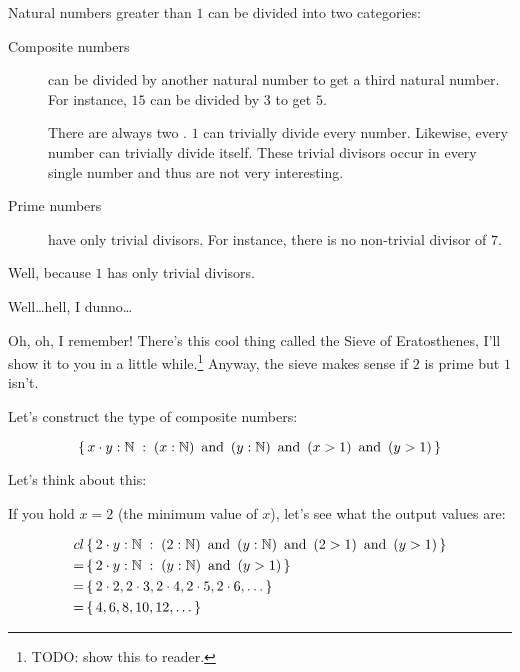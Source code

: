 \begin{example}
    Natural numbers greater than $1$ can be divided into two categories:

    \begin{description}
      \item[Composite numbers] can be divided by another natural number to get a
        third natural number. For instance, $15$ can be divided by $3$ to get
        $5$.

        There are always two . $1$ can trivially divide
        every number. Likewise, every number can trivially divide itself. These
        trivial divisors occur in every single number and thus are not very
        interesting.

      \item[Prime numbers] have only trivial divisors. For instance, there is no
        non-trivial divisor of $7$.
    \end{description}


    Well, because $1$ has only trivial divisors.


    Well\dots hell, I dunno\dots

    Oh, oh, I remember! There's this cool thing called the Sieve of
    Eratosthenes, I'll show it to you in a little while.\footnote{TODO: show
      this to reader.} Anyway, the sieve makes sense if $2$ is prime but $1$
    isn't.

    Let's construct the type of composite numbers:

    \begin{equation}
        \label{eq:composite}
        \left\{\, x \cdot y : \mathbb{N}\; : \; 
          \left( x : \mathbb{N} \right)
          \text{ and }
          \left( y : \mathbb{N} \right)
          \text{ and }
          \left( x > 1 \right)
          \text{ and }
          \left( y > 1 \right)
         \,\right\}
    \end{equation}

    Let's think about this:

    If you hold $x = 2$ (the minimum value of $x$), let's see what the output
    values are:

    \begin{eqnarray}{cl}
       & \left\{\, 2 \cdot y : \mathbb{N}\; : \; 
           \left( 2 : \mathbb{N} \right)
           \text{ and }
           \left( y : \mathbb{N} \right)
           \text{ and }
           \left( 2 > 1 \right)
           \text{ and }
           \left( y > 1 \right)
          \,\right\} \\
       = & \left\{\, 2 \cdot y : \mathbb{N}\; : \; 
             \left( y : \mathbb{N} \right)
             \text{ and }
             \left( y > 1 \right)
            \,\right\} \\
       = & \left\{\, 2 \cdot 2, 2 \cdot 3, 2 \cdot 4, 2 \cdot 5, 2 \cdot 6, \dots \,\right\} \\
       = & \left\{\, 4, 6, 8, 10, 12,  \dots \,\right\} \\
    \end{eqnarray}


\end{example}
